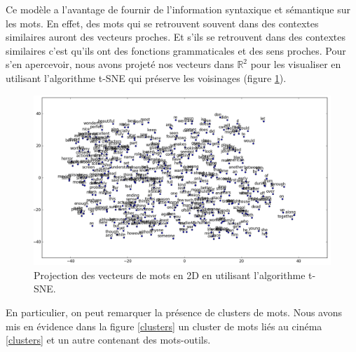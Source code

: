 \documentclass{article}
\begin{document}
Ce modèle a l'avantage de fournir de l'information syntaxique et sémantique sur les mots. En effet, des mots qui se retrouvent souvent dans des contextes similaires auront des vecteurs proches. Et s'ils se retrouvent dans des contextes similaires c'est qu'ils ont des fonctions grammaticales et des sens proches. Pour s'en apercevoir, nous avons projeté nos vecteurs dans $\mathbb{R}^{2}$ pour les visualiser en utilisant l'algorithme t-SNE \cite{van2008visualizing} qui préserve les voisinages (figure \ref{tsne_plot}).

\begin{figure}[h]
\begin{center}
\includegraphics[scale=0.35]{images/tsne_plot.png}
\caption{Projection des vecteurs de mots en 2D en utilisant l'algorithme t-SNE.}
\label{tsne_plot}
\end{center}
\end{figure}

En particulier, on peut remarquer la présence de clusters de mots. Nous avons mis en évidence dans la figure \ref{clusters} un cluster de mots liés au cinéma \ref{clusters} et un autre contenant des mots-outils.
\end{document}
